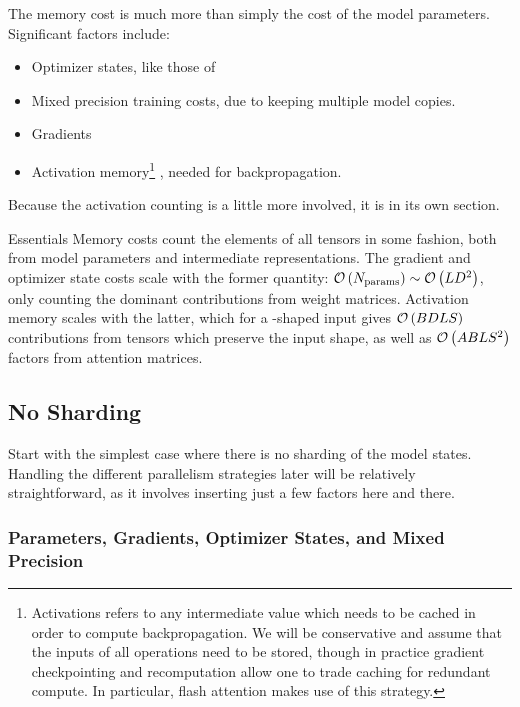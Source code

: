 \documentclass[11pt]{article}
\begin{document}
The memory cost is much more than simply the cost of the model
parameters. Significant factors include:
\begin{itemize}
	\item Optimizer states, like those of 
	\item Mixed precision training costs, due to keeping multiple model copies.
	\item Gradients
	\item Activation memory\footnote{Activations refers to any intermediate value which needs to be
		      cached in order to compute backpropagation. We will be conservative and assume that the inputs
		      of all operations need to be stored, though in practice gradient checkpointing and recomputation
		      allow one to trade caching for redundant compute. In particular, flash attention
		      \cite{dao2022flashattention} makes use of this strategy.} , needed for backpropagation.
\end{itemize}
Because the activation counting is a little more involved, it is in its own section.


\begin{nicebox}{Essentials}
	Memory costs count the elements of all tensors in some fashion, both from model parameters and
	intermediate representations. The gradient and optimizer state costs scale with the former quantity:
	$ \mathcal{O} \left ( N _{ {\rm params}  } \right ) \sim \mathcal{O} \left ( L D ^{ 2 } \right )$, only counting
	the dominant contributions from weight matrices. Activation memory scales with the latter,
	which for a -shaped input gives $ \mathcal{O} \left ( BDLS  \right ) $ contributions
	from tensors which preserve the input shape, as well as $ \mathcal{O} \left( ABLS ^{ 2 } \right)  $
	factors from attention matrices.
\end{nicebox}


\subsection{No Sharding}

Start with the simplest case where there is no sharding of the model states. Handling the different
parallelism strategies later will be relatively straightforward, as it involves inserting just a few
factors here and there.

\subsubsection{Parameters, Gradients, Optimizer States, and Mixed Precision
	\label{sec_params_grads_optim_mem}}
\end{document}
